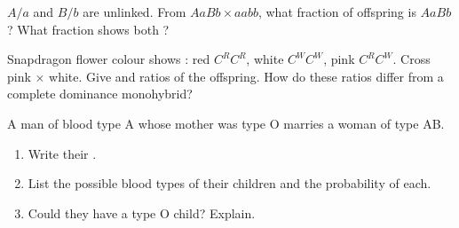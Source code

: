 \begin{exercise}[$\star\star\star$]\label{exo:g11:mendelian-genetics:10}
 $A/a$ and $B/b$ are unlinked. From $AaBb \times aabb$, what fraction of
offspring is $AaBb$? What fraction shows both  ?
\end{exercise}

\begin{exercise}[$\star\star$]\label{exo:g11:mendelian-genetics:11}
Snapdragon flower colour shows : red $C^{R}C^{R}$, white
$C^{W}C^{W}$, pink $C^{R}C^{W}$. Cross pink $\times$ white. Give  and
 ratios of the offspring. How do these ratios differ from a complete
dominance monohybrid?
\end{exercise}

\begin{exercise}[$\star\star\star$]\label{exo:g11:mendelian-genetics:12}
A man of blood type A whose mother was type O marries a woman of type AB.
\begin{enumerate}
  \item Write their .
  \item List the possible blood types of their children and the probability of
        each.
  \item Could they have a type O child? Explain.
\end{enumerate}
\end{exercise}

